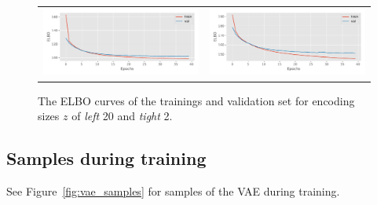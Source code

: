 \documentclass{article}
\begin{document}
\begin{figure}[]
  \centering
  \begin{tabularx}{\linewidth}{XX}
    \includegraphics[width=\linewidth]{assignment_3/code/figures/vae_20.pdf} &
    \includegraphics[width=\linewidth]{assignment_3/code/figures/vae_2.pdf}
  \end{tabularx}
  \caption{The ELBO curves of the trainings and validation set for encoding sizes \(z\) of \textit{left} 20 and \textit{tight} 2.}
  \label{fig:elbo}
\end{figure}

\subsection{Samples during training}
See Figure~\ref{fig:vae_samples} for samples of the VAE during training.
\end{document}
